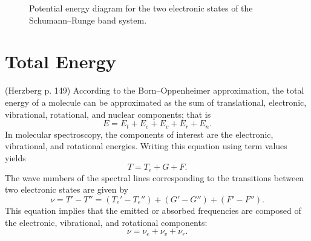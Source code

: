 \documentclass[11pt, twoside, fleqn]{report}
\newcommand{\state}[2]{\prescript{#1}{}{#2}}
\begin{document}
\begin{figure}[H]
        \caption{Potential energy diagram for the two electronic states of the Schumann--Runge band system.}
    \end{figure}

    \section{Total Energy}

    (Herzberg p. 149)
    According to the Born--Oppenheimer approximation, the total energy of a molecule can be approximated as the sum of translational, electronic, vibrational, rotational, and nuclear components; that is
    \begin{equation*}
        E = E_t + E_e + E_v + E_r + E_n.
    \end{equation*}
    In molecular spectroscopy, the components of interest are the electronic, vibrational, and rotational energies. Writing this equation using term values yields
    \begin{equation*}
        T = T_e + G + F.
    \end{equation*}
    The wave numbers of the spectral lines corresponding to the transitions between two electronic states are given by
    \begin{equation*}
        \nu = T' - T'' = (T_e' - T_e'') + (G' - G'') + (F' - F'').
    \end{equation*}
    This equation implies that the emitted or absorbed frequencies are composed of the electronic, vibrational, and rotational components:
    \begin{equation*}
        \nu = \nu_e + \nu_v + \nu_r.
    \end{equation*}
\end{document}
